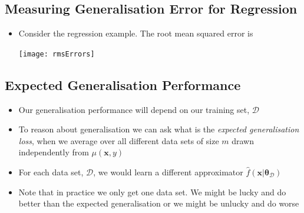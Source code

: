 \begin{slide}
\section[-1]{Measuring Generalisation Error for Regression}

\begin{PauseHighLight}

\begin{itemize}
\item Consider the regression example.  The root mean squared error
  is
  \begin{center}
    \noindent\texttt{[image: rmsErrors]}
  \end{center}\pause
\end{itemize}

\end{PauseHighLight}
\end{slide}

\Outline %

\begin{slide}
\section{Expected Generalisation Performance}

\begin{PauseHighLight}
  \begin{itemize}
  \item Our generalisation performance will depend on our training set,
    $\mathcal{D}$\pause
  \item To reason about generalisation we can ask what is the
    \textit{expected generalisation loss}, when we average over
    all different data sets of size $m$ drawn independently from
    $\mu(\bm{x},y)$\pause
  \item For each data set, $\mathcal{D}$, we would learn a different
    approximator $\hat{f}(\bm{x}\vert \bm{\theta}_\mathcal{D})$\pause
  \item Note that in practice we only get one data set.  We might be
    lucky and do better than the expected generalisation or we might be
    unlucky and do worse\pause
  \end{itemize}
\end{PauseHighLight}

\end{slide}


